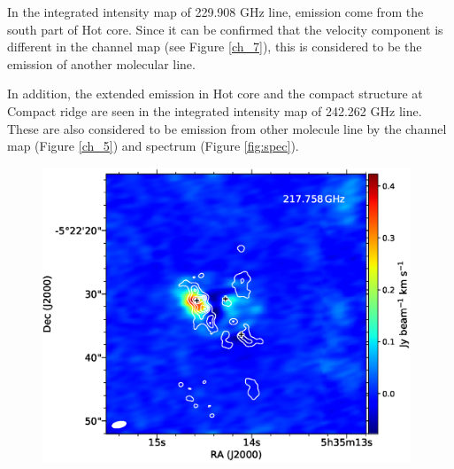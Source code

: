 In the integrated intensity map of 229.908 GHz line, emission come from the south part of Hot core.
Since it can be confirmed that the velocity component is different in the channel map (see Figure \ref{ch_7}), 
this is considered to be the emission of another molecular line.

In addition, the extended emission in Hot core and the compact structure at Compact ridge are seen 
in the integrated intensity map of 242.262 GHz line. These are also considered to be emission from other molecule line 
by the channel map (Figure \ref{ch_5}) and spectrum (Figure \ref{fig:spec}).

\newpage
\begin{figure}[H] 
\begin{center}
\begin{minipage}{0.98\textwidth} 
\begin{center}
\begin{minipage}{0.48\textwidth}
\begin{center}
\includegraphics[width=0.98\textwidth]{OrionKL/mom0/217.758mom0_3-7.eps}
\end{center}
\end{minipage}
\begin{minipage}{0.48\textwidth}
\begin{center}

\end{center}
\end{minipage}
\end{center}
\end{minipage}
\end{center}
\end{figure}
